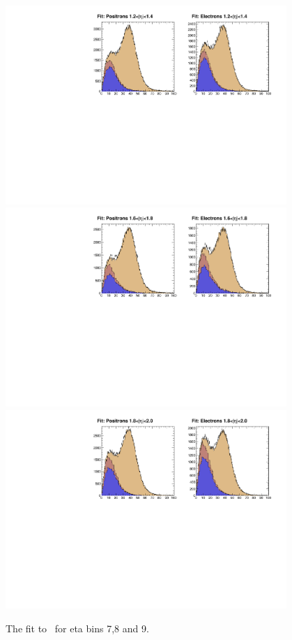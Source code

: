 \begin{figure}
  \begin{center}
\includegraphics[width=0.95\textwidth]{data_6.pdf} \\
\includegraphics[width=0.95\textwidth]{data_7.pdf} \\
\includegraphics[width=0.95\textwidth]{data_8.pdf}
 \caption{  \label{fig:data3} The fit to \MET\ for eta bins 7,8 and 9.}
  \end{center}
\end{figure}

